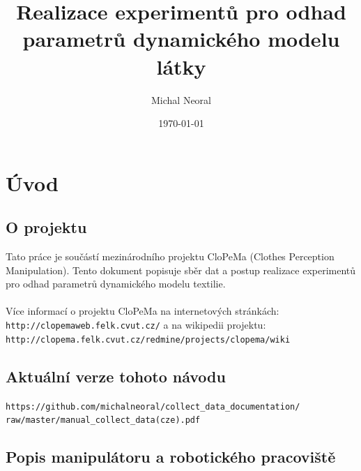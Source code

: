 \documentclass[10pt,a4paper,titlepage,oneside]{report}
\begin{document}
\title{Realizace experimentů pro odhad parametrů dynamického modelu látky}
\author{Michal Neoral}
\date{\today{}}
\maketitle

\thispagestyle{fancy}


\chapter{Úvod}
\label{chap:intro}



\section{O projektu}
\label{sec:about}
Tato práce je součástí mezinárodního projektu CloPeMa (Clothes Perception Manipulation). Tento dokument popisuje sběr dat a postup realizace experimentů pro odhad parametrů dynamického modelu textilie.\\
\\
Více informací o projektu CloPeMa na internetových stránkách: \verb|http://clopemaweb.felk.cvut.cz/| a na wikipedii projektu: \verb|http://clopema.felk.cvut.cz/redmine/projects/clopema/wiki|
\\



\section{Aktuální verze tohoto návodu}
\verb|https://github.com/michalneoral/collect_data_documentation/|\\
\verb|raw/master/manual_collect_data(cze).pdf|\\




\section{Popis manipulátoru a robotického pracoviště}
\label{sec:desription}
\end{document}
